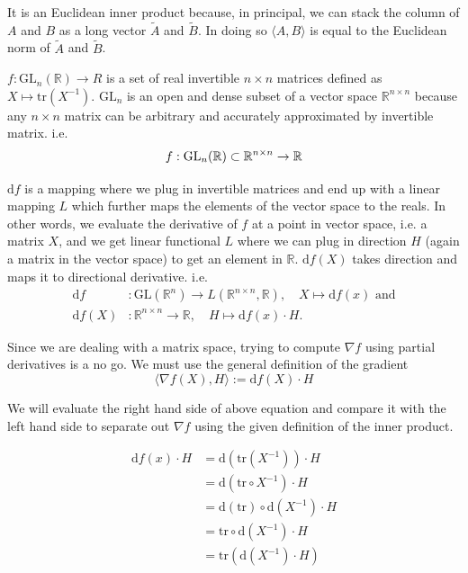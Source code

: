 \documentclass{article}
\begin{document}
\begin{enumerate}[start=9]
\begin{ans_box}
    It is an Euclidean inner product because, in principal, we can stack the column of $A$ and $B$ as a long vector $\tilde{A}$ and $\tilde{B}$. In doing so $\langle A,B\rangle$ is equal to the Euclidean norm of $\tilde{A}$ and $\tilde{B}$.\medskip

    $f:\text{GL}_{n}(\mathbb{R})\to R$ is a set of real invertible $n\times n$ matrices defined as $X\mapsto\text{tr}(X^{-1})$. $\text{GL}_{n}$ is an open and dense subset of a vector space $\mathbb{R}^{n\times n}$ because any $n\times n$ matrix can be arbitrary and accurately approximated by invertible matrix. i.e.
  $$
  f:\text{GL}_{n}(\mathbb{R})\subset\mathbb{R}^{n\times n}\to\mathbb{R}\\
  $$

  $\text{d}f$ is a mapping where we plug in invertible matrices and end up with a linear mapping $L$ which further maps the elements of the vector space to the reals. In other words, we evaluate the derivative of $f$ at a point in vector space, i.e. a matrix $X$, and we get linear functional $L$ where we can plug in direction $H$ (again a matrix in the vector space) to get an element in $\mathbb{R}$. $\text{d}f(X)$ takes direction and maps it to directional derivative. i.e.\medskip
  \begin{equation*}
    \begin{split}
      \text{d}f&:\text{GL}(\mathbb{R}^{n})\to L(\mathbb{R}^{n\times n},\mathbb{R}),\quad X\mapsto\text{d}f(x)\text{ and}\\
      \text{d}f(X)&:\mathbb{R}^{n\times n}\to \mathbb{R},\quad H\mapsto\text{d}f(x)\cdot H.
    \end{split}
  \end{equation*}

  Since we are dealing with a matrix space, trying to compute $\nabla f$ using partial derivatives is a no go. We must use the general definition of the gradient
    $$
    \langle\nabla f(X),H\rangle:=\text{d}f(X)\cdot H
    $$

  We will evaluate the right hand side of above equation and compare it with the left hand side to separate out $\nabla f$ using the given definition of the inner product.

  \begin{equation}
    \begin{split}
      \label{eqn:9a}
      \text{d}f(x)\cdot H&=\text{d}(\text{tr}(X^{-1}))\cdot H\\
      &=\text{d}(\text{tr}\circ X^{-1})\cdot H\\
      &=\text{d}(\text{tr})\circ\text{d}(X^{-1})\cdot H\\
      &=\text{tr}\circ\text{d}(X^{-1})\cdot H\\
      &=\text{tr}(\text{d}(X^{-1})\cdot H)
    \end{split}
  \end{equation}


\end{ans_box}
\end{enumerate}
\end{document}

